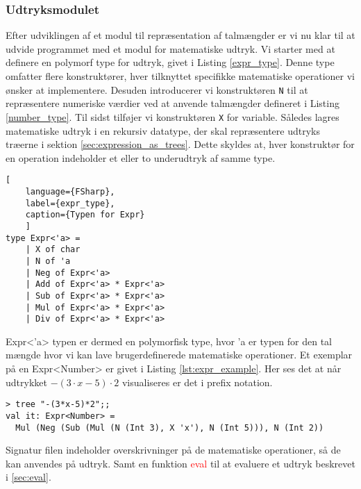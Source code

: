 \subsubsection{Udtryksmodulet}\label{sec:expression_module}
Efter udviklingen af et modul til repræsentation af talmængder er vi nu klar til at udvide programmet med et modul for matematiske udtryk. Vi starter med at definere en polymorf type for udtryk, givet i Listing \ref{expr_type}. Denne type omfatter flere konstruktører, hver tilknyttet specifikke matematiske operationer vi ønsker at implementere. Desuden introducerer vi konstruktøren \texttt{N} til at repræsentere numeriske værdier ved at anvende talmængder defineret i Listing \ref{number_type}. Til sidst tilføjer vi konstruktøren \texttt{X} for variable. Således lagres matematiske udtryk i en rekursiv datatype, der skal repræsentere udtryks træerne i sektion \ref{sec:expression_as_trees}. Dette skyldes at, hver konstruktør for en operation indeholder et eller to underudtryk af samme type.


\begin{lstlisting}[
    language={FSharp}, 
    label={expr_type}, 
    caption={Typen for Expr}
    ]
type Expr<'a> = 
    | X of char
    | N of 'a
    | Neg of Expr<'a>
    | Add of Expr<'a> * Expr<'a>
    | Sub of Expr<'a> * Expr<'a>
    | Mul of Expr<'a> * Expr<'a>
    | Div of Expr<'a> * Expr<'a>
\end{lstlisting}

Expr\textless'a\textgreater{}  typen er dermed en polymorfisk type, hvor 'a er typen for den tal mængde hvor vi kan lave brugerdefinerede matematiske operationer. Et exemplar på en Expr\textless Number\textgreater{}  er givet i Listing \ref{lst:expr_example}. Her ses det at når udtrykket $-(3 \cdot x - 5) \cdot 2$ visualiseres er det i prefix notation.

\begin{lstlisting}[style=output, label={lst:expr_example}, caption={$-(3 \cdot x - 5) \cdot 2$ som et udtryks træ. Funktionen \textcolor{red}{tree} bliver beskrevet i \ref{sec:expression_generation}.}]
> tree "-(3*x-5)*2";;
val it: Expr<Number> = 
  Mul (Neg (Sub (Mul (N (Int 3), X 'x'), N (Int 5))), N (Int 2))
\end{lstlisting}

Signatur filen indeholder overskrivninger på de matematiske operationer, så de kan anvendes på udtryk. Samt en funktion \textcolor{red}{eval} til at evaluere et udtryk beskrevet i \ref{sec:eval}. 




